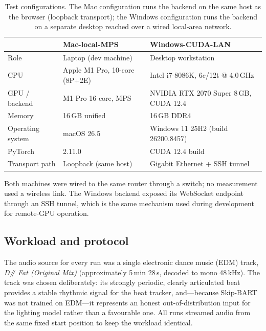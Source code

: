 \begin{table}[htbp]
\centering
\caption{Test configurations. The Mac configuration runs the backend on the same host as the browser (loopback transport); the Windows configuration runs the backend on a separate desktop reached over a wired local-area network.}
\label{tab:eval-machines}
\small
\begin{tabular}{@{}lll@{}}
\toprule
 & \textbf{Mac-local-MPS} & \textbf{Windows-CUDA-LAN} \\
\midrule
Role            & Laptop (dev machine)              & Desktop workstation \\
CPU             & Apple M1 Pro, 10-core (8P+2E)     & Intel i7-8086K, 6c/12t @ 4.0\,GHz \\
GPU / backend   & M1 Pro 16-core, MPS               & NVIDIA RTX 2070 Super 8\,GB, CUDA 12.4 \\
Memory          & 16\,GB unified                    & 16\,GB DDR4 \\
Operating system& macOS 26.5                        & Windows 11 25H2 (build 26200.8457) \\
PyTorch         & 2.11.0                            & CUDA 12.4 build \\
Transport path  & Loopback (same host)              & Gigabit Ethernet + SSH tunnel \\
\bottomrule
\end{tabular}
\end{table}

Both machines were wired to the same router through a switch; no measurement used a wireless link. The Windows backend exposed its WebSocket endpoint through an SSH tunnel, which is the same mechanism used during development for remote-GPU operation.

\subsection{Workload and protocol}

The audio source for every run was a single electronic dance music (EDM) track, \emph{D\# Fat (Original Mix)} (approximately 5\,min 28\,s, decoded to mono 48\,kHz). The track was chosen deliberately: its strongly periodic, clearly articulated beat provides a stable rhythmic signal for the beat tracker, and---because Skip-BART was not trained on EDM---it represents an honest out-of-distribution input for the lighting model rather than a favourable one. All runs streamed audio from the same fixed start position to keep the workload identical.

